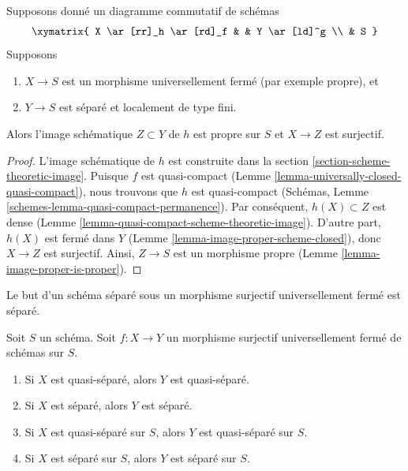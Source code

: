 \begin{lemma}
\label{lemma-scheme-theoretic-image-is-proper}
Supposons donné un diagramme commutatif de schémas
$$
\xymatrix{
X \ar[rr]_h \ar[rd]_f & & Y \ar[ld]^g \\
& S
}
$$
Supposons
\begin{enumerate}
\item $X \to S$ est un morphisme universellement fermé (par exemple propre), et
\item $Y \to S$ est séparé et localement de type fini.
\end{enumerate}
Alors l'image schématique $Z \subset Y$ de $h$ est propre
sur $S$ et $X \to Z$ est surjectif.
\end{lemma}

\begin{proof}
L'image schématique de $h$ est construite
dans la section \ref{section-scheme-theoretic-image}. Puisque $f$ est
quasi-compact (Lemme \ref{lemma-universally-closed-quasi-compact}), nous
trouvons que $h$ est
quasi-compact (Schémas, Lemme \ref{schemes-lemma-quasi-compact-permanence}). Par
conséquent, $h(X) \subset Z$
est dense (Lemme \ref{lemma-quasi-compact-scheme-theoretic-image}). D'autre part, $h(X)$
est fermé dans $Y$
(Lemme \ref{lemma-image-proper-scheme-closed}), donc $X \to Z$
est surjectif. Ainsi,
$Z \to S$ est un morphisme propre (Lemme \ref{lemma-image-proper-is-proper}).
\end{proof}

\noindent
Le but d'un schéma séparé sous un morphisme surjectif
universellement fermé est séparé.

\begin{lemma}
\label{lemma-image-universally-closed-separated}
Soit $S$ un schéma. Soit $f : X \to Y$ un morphisme surjectif universellement fermé
de schémas sur $S$.
\begin{enumerate}
\item Si $X$ est quasi-séparé, alors $Y$ est quasi-séparé.
\item Si $X$ est séparé, alors $Y$ est séparé.
\item Si $X$ est quasi-séparé sur $S$, alors $Y$ est quasi-séparé sur $S$.
\item Si $X$ est séparé sur $S$, alors $Y$ est séparé sur $S$.
\end{enumerate}
\end{lemma}

